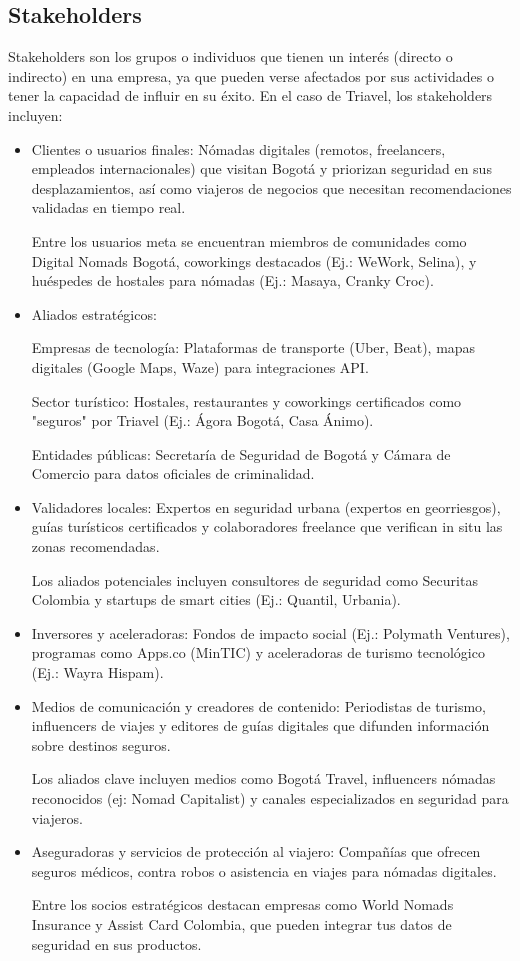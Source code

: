 \subsection{Stakeholders}
Stakeholders son los grupos o individuos que tienen un interés (directo o indirecto) en una empresa, ya que pueden verse afectados por sus actividades o tener la capacidad de influir en su éxito. En el caso de Triavel, los stakeholders incluyen: 
\begin{itemize}
\item Clientes o usuarios finales: Nómadas digitales (remotos, freelancers, empleados internacionales) que visitan Bogotá y priorizan seguridad en sus desplazamientos, así como viajeros de negocios que necesitan recomendaciones validadas en tiempo real.

Entre los usuarios meta se encuentran miembros de comunidades como Digital Nomads Bogotá, coworkings destacados (Ej.: WeWork, Selina), y huéspedes de hostales para nómadas (Ej.: Masaya, Cranky Croc).

\item Aliados estratégicos:

Empresas de tecnología: Plataformas de transporte (Uber, Beat), mapas digitales (Google Maps, Waze) para integraciones API.

Sector turístico: Hostales, restaurantes y coworkings certificados como "seguros" por Triavel (Ej.: Ágora Bogotá, Casa Ánimo).

Entidades públicas: Secretaría de Seguridad de Bogotá y Cámara de Comercio para datos oficiales de criminalidad.

\item Validadores locales: Expertos en seguridad urbana (expertos en georriesgos), guías turísticos certificados y colaboradores freelance que verifican in situ las zonas recomendadas.

Los aliados potenciales incluyen consultores de seguridad como Securitas Colombia y startups de smart cities (Ej.: Quantil, Urbania).

\item Inversores y aceleradoras: Fondos de impacto social (Ej.: Polymath Ventures), programas como Apps.co (MinTIC) y aceleradoras de turismo tecnológico (Ej.: Wayra Hispam).
\item Medios de comunicación y creadores de contenido: Periodistas de turismo, influencers de viajes y editores de guías digitales que difunden información sobre destinos seguros.

Los aliados clave incluyen medios como Bogotá Travel, influencers nómadas reconocidos (ej: Nomad Capitalist) y canales especializados en seguridad para viajeros.

\item Aseguradoras y servicios de protección al viajero: Compañías que ofrecen seguros médicos, contra robos o asistencia en viajes para nómadas digitales.

Entre los socios estratégicos destacan empresas como World Nomads Insurance y Assist Card Colombia, que pueden integrar tus datos de seguridad en sus productos.
\end{itemize}

